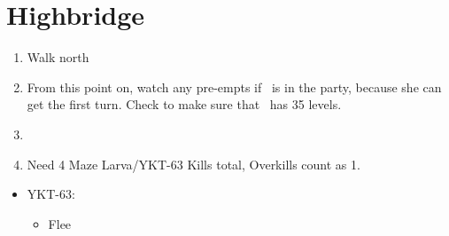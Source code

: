 \chapter{Highbridge}
\begin{spheregrid}
	\begin{itemize}
		\yunaf
	\end{itemize}
\end{spheregrid}
\begin{enumerate}
	\item Walk north
	\item From this point on, watch any pre-empts if \yuna\ is in the party, because she can get the first turn. Check to make sure that \lulu\ has 35 levels.
	\item \formation{\tidus}{\yuna}{\auron}
	\item Need 4 Maze Larva/YKT-63 Kills total, Overkills count as 1.
\end{enumerate}
\bothvfill
\winvfill
\begin{encounters}
	\begin{itemize}
		\item YKT-63:
		      \begin{itemize}
			      \tidusf Attack
			      \yunaf Attack
			      \item Flee
		      \end{itemize}
	\end{itemize}
\end{encounters}

